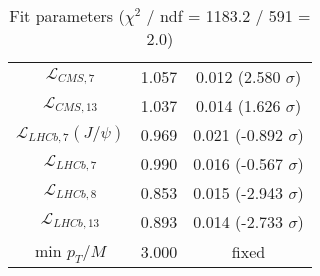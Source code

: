 \begin{table}[h!]
\begin{tabular}{c|c|c}
$\mathcal L_{CMS,7}$ & 1.057 & 0.012 (2.580 $\sigma$) \\
$\mathcal L_{CMS,13}$ & 1.037 & 0.014 (1.626 $\sigma$) \\
$\mathcal L_{LHCb,7}(J/\psi)$ & 0.969 & 0.021 (-0.892 $\sigma$) \\
$\mathcal L_{LHCb,7}$ & 0.990 & 0.016 (-0.567 $\sigma$) \\
$\mathcal L_{LHCb,8}$ & 0.853 & 0.015 (-2.943 $\sigma$) \\
$\mathcal L_{LHCb,13}$ & 0.893 & 0.014 (-2.733 $\sigma$) \\
min $p_T/M$ & 3.000 & fixed \\
\end{tabular}
\caption{Fit parameters ($\chi^2$ / ndf = 1183.2 / 591 = 2.0)}
\end{table}
